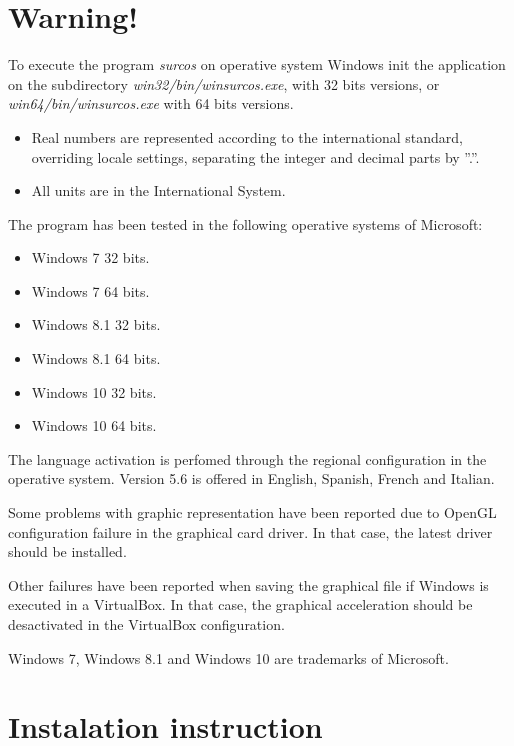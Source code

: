 \chapter*{Warning!}

To execute the program \emph{surcos} on operative system Windows init the
application on the subdirectory \emph{win32/bin/winsurcos.exe}, with 32 bits
versions, or \emph{win64/bin/winsurcos.exe} with 64 bits versions.

\begin{itemize}
\item Real numbers are represented according to the international standard,
overriding locale settings, separating the integer and decimal parts by ''.''.
\item All units are in the International System.
\end{itemize}

The program has been tested in the following operative systems of Microsoft:
\begin{itemize}
\item Windows 7 32 bits.
\item Windows 7 64 bits.
\item Windows 8.1 32 bits.
\item Windows 8.1 64 bits.
\item Windows 10 32 bits.
\item Windows 10 64 bits.
\end{itemize}

The language activation is perfomed through the regional configuration in the 
operative system. Version 5.6 is offered in English, Spanish, French and Italian. 

Some problems with graphic representation have been reported due to OpenGL 
configuration failure in the graphical card driver. In that case, the latest driver
should be installed.

Other failures have been reported when saving the graphical file if Windows is
executed in a VirtualBox. In that case, the graphical acceleration should be desactivated
in the VirtualBox configuration.

Windows 7, Windows 8.1 and Windows 10 are trademarks of Microsoft.

\setcounter{page}{1}

\chapter{Instalation instruction}

